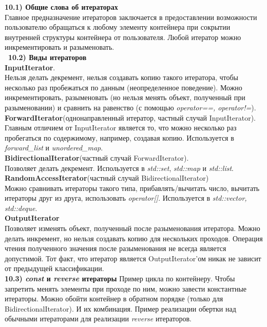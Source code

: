 \documentclass{article}
\begin{document}
\noindent \textbf{10.1) Общие  слова об итераторах}\\
Главное предназначение итераторов заключается в предоставлении возможности пользователю обращаться к любому элементу контейнера при сокрытии внутренней структуры контейнера от пользователя. 
Любой итератор можно инкрементировать и разыменовать.\\\
\noindent \textbf{10.2) Виды итераторов}\\
\textbf{InputIterator}.\\ Нельзя делать декремент, нельзя создавать копию такого итератора, чтобы несколько раз пробежаться по данным (неопределенное поведение). Можно инкрементировать, разыменовать (но нельзя менять объект, полученный при разыменовании) и сравнить на равенство (с помощью \textit{operator==, operator!=}).\\
\textbf{ForwardIterator}(однонаправленный итератор, частный случай InputIterator).\\ Главным отличием от InputIterator является то, что можно несколько раз пробегаться по содержимому, например, создавая копию. Используется в \textit{forward\_list} и \textit{unordered\_map}.\\
\textbf{BidirectionalIterator}(частный случай ForwardIterator).\\ Позволяет делать декремент. Используется в \textit{std::set}, \textit{std::map} и \textit{std::list}.\\
\textbf{RandomAccessIterator}(частный случай BidirectionalIterator)\\ Можно сравнивать итераторы такого типа, прибавлять/вычитать число, вычитать итераторы друг из друга, использовать \textit{operator[]}. Используется в \textit{std::vector, std::deque}.\\
\textbf{OutputIterator}\\ Позволяет изменять объект, полученный после разыменования итератора. Можно делать инкремент, но нельзя создавать копию для нескольких проходов. Операция чтения полученного значения после разыменования не всегда является допустимой. Тот факт, что итератор является OutputIterator'ом никак не зависит от предыдущей классификации.\\
\noindent \textbf{10.3) \textit{const} и \textit{reverse} итераторы}
\cs{20-21}
Пример цикла по контейнеру. 
Чтобы запретить менять элементы при проходе по ним, можно завести константные итераторы. 
\cs{23-23}
Можно обойти контейнер в обратном порядке (только для BidirectionalIterator).
\cs{24-24}
И их комбинация.
Пример реализации обертки над обычными итераторами для реализации \textit{reverse} итераторов.\\
\end{document}
